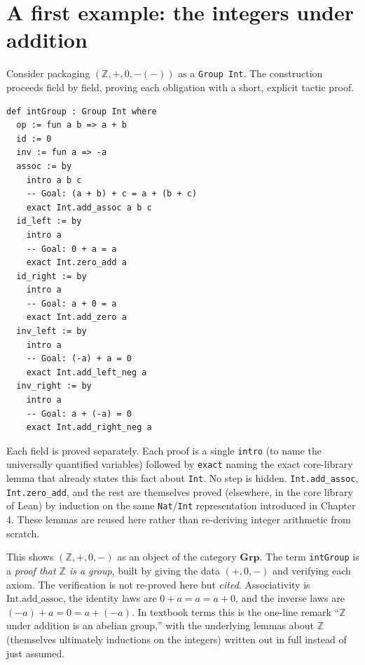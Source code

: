 \section{A first example: the integers under addition}\label{sec:06-groups:03-integers-example:1}

Consider packaging \((\mathbb{Z}, +, 0, -(-))\) as a \texttt{Group Int}. The construction proceeds field by field, proving each obligation with a short, explicit tactic proof.

\begin{lstlisting}
def intGroup : Group Int where
  op := fun a b => a + b
  id := 0
  inv := fun a => -a
  assoc := by
    intro a b c
    -- Goal: (a + b) + c = a + (b + c)
    exact Int.add_assoc a b c
  id_left := by
    intro a
    -- Goal: 0 + a = a
    exact Int.zero_add a
  id_right := by
    intro a
    -- Goal: a + 0 = a
    exact Int.add_zero a
  inv_left := by
    intro a
    -- Goal: (-a) + a = 0
    exact Int.add_left_neg a
  inv_right := by
    intro a
    -- Goal: a + (-a) = 0
    exact Int.add_right_neg a
\end{lstlisting}

Each field is proved separately. Each proof is a single \texttt{intro} (to name the universally quantified variables) followed by \texttt{exact} naming the exact core-library lemma that already states this fact about \texttt{Int}. No step is hidden. \texttt{Int.add\_\allowbreak{}assoc}, \texttt{Int.zero\_\allowbreak{}add}, and the rest are themselves proved (elsewhere, in the core library of Lean) by induction on the same \texttt{Nat}/\texttt{Int} representation introduced in Chapter 4. These lemmas are reused here rather than re-deriving integer arithmetic from scratch.

\begin{mathreading}

This shows \((\mathbb{Z}, +, 0, -)\) as an object of the category \(\mathbf{Grp}\). The term \texttt{intGroup} is a \emph{proof that \(\mathbb{Z}\) is a group}, built by giving the data \((+, 0, -)\) and verifying each axiom. The verification is not re-proved here but \emph{cited}. Associativity is \(\mathrm{Int.add\_assoc}\), the identity laws are \(0 + a = a = a + 0\), and the inverse laws are \((-a) + a = 0 = a + (-a)\). In textbook terms this is the one-line remark ``\(\mathbb{Z}\) under addition is an abelian group,'' with the underlying lemmas about \(\mathbb{Z}\) (themselves ultimately inductions on the integers) written out in full instead of just assumed.

\end{mathreading}

